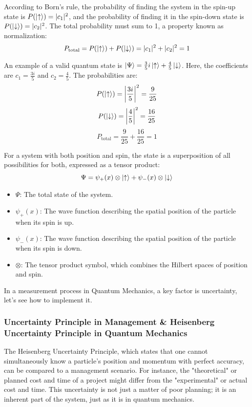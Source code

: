 \documentclass{article}
\begin{document}
 According to Born's rule, the probability of finding the system in the spin-up state is $P(\ket{\uparrow}) = |c_1|^2$, and the probability of finding it in the spin-down state is $P(\ket{\downarrow}) = |c_2|^2$. The total probability must sum to 1, a property known as normalization:
 $$ P_{\text{total}} = P(\ket{\uparrow}) + P(\ket{\downarrow}) = |c_1|^2 + |c_2|^2 = 1 $$
 
 An example of a valid quantum state is $\ket{\Psi} = \frac{3}{5}i \ket{\uparrow} + \frac{4}{5} \ket{\downarrow}$. Here, the coefficients are $c_1 = \frac{3i}{5}$ and $c_2 = \frac{4}{5}$.
 The probabilities are:
 $$ P(\ket{\uparrow}) = \left|\frac{3i}{5}\right|^2 = \frac{9}{25} $$
 $$ P(\ket{\downarrow}) = \left|\frac{4}{5}\right|^2 = \frac{16}{25} $$
 $$ P_{\text{total}} = \frac{9}{25} + \frac{16}{25} = 1 $$
 
 For a system with both position and spin, the state is a superposition of all possibilities for both, expressed as a tensor product:
 $$ \Psi = \psi_+(x) \otimes \ket{\uparrow} + \psi_-(x) \otimes \ket{\downarrow} $$
 \begin{itemize}
 	\item $\Psi$: The total state of the system.
 	\item $\psi_+(x)$: The wave function describing the spatial position of the particle when its spin is up.
 	\item $\psi_-(x)$: The wave function describing the spatial position of the particle when its spin is down.
 	\item $\otimes$: The tensor product symbol, which combines the Hilbert spaces of position and spin.
 \end{itemize}

 In a measurement process in Quantum Mechanics, a key factor is uncertainty, let's see how to implement it.
 \newpage
 \subsubsection*{Uncertainty Principle in Management \& Heisenberg Uncertainty Principle in Quantum Mechanics}
The Heisenberg Uncertainty Principle, which states that one cannot simultaneously know a particle's position and momentum with perfect accuracy, can be compared to a management scenario. For instance, the "theoretical" or planned cost and time of a project might differ from the "experimental" or actual cost and time. This uncertainty is not just a matter of poor planning; it is an inherent part of the system, just as it is in quantum mechanics.
 
\end{document}
